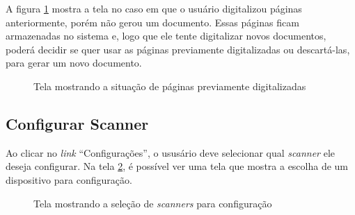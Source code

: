 A figura \ref{fig:dig_8} mostra a tela no caso em que o usuário digitalizou páginas anteriormente, porém não gerou um documento. Essas páginas ficam armazenadas no sistema e, logo que ele tente digitalizar novos documentos, poderá decidir se quer usar as páginas previamente digitalizadas ou descartá-las, para gerar um novo documento.

\begin{figure}[h]
 \centering
    \setlength\fboxsep{0pt}
    \setlength\fboxrule{0.5pt}
  \caption {Tela mostrando a situação de páginas previamente digitalizadas}
  \label{fig:dig_8}
\end{figure}



\subsection{Configurar Scanner}
\label{sec:mockups_configurar}

Ao clicar no {\it link} ``Configurações'', o ususário deve selecionar qual {\it scanner} ele deseja configurar. Na tela \ref{fig:config_1}, é possível ver uma tela que mostra a escolha de um dispositivo para configuração.

\begin{figure}[h]
 \centering
    \setlength\fboxsep{0pt}
    \setlength\fboxrule{0.5pt}
  \caption {Tela mostrando a seleção de {\it scanners} para configuração}
  \label{fig:config_1}
\end{figure}

